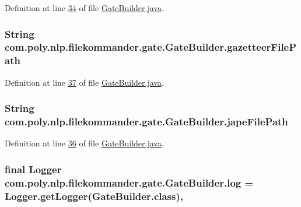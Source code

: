 Definition at line \hyperlink{L34}{34} of file \hyperlink{}{Gate\-Builder.\-java}.

\hypertarget{classcom_1_1poly_1_1nlp_1_1filekommander_1_1gate_1_1_gate_builder_adceaef80d20a83bd8c1cded83b90a692}{
\subsubsection[{gazetteer\-File\-Path}]{\setlength{\rightskip}{0pt plus 5cm}String com.\-poly.\-nlp.\-filekommander.\-gate.\-Gate\-Builder.\-gazetteer\-File\-Path\hspace{0.3cm}{\ttfamily [private]}}}\label{classcom_1_1poly_1_1nlp_1_1filekommander_1_1gate_1_1_gate_builder_adceaef80d20a83bd8c1cded83b90a692}


Definition at line \hyperlink{L37}{37} of file \hyperlink{}{Gate\-Builder.\-java}.

\hypertarget{classcom_1_1poly_1_1nlp_1_1filekommander_1_1gate_1_1_gate_builder_a58783e8638545aa5ea65a89aa1061dde}{
\subsubsection[{jape\-File\-Path}]{\setlength{\rightskip}{0pt plus 5cm}String com.\-poly.\-nlp.\-filekommander.\-gate.\-Gate\-Builder.\-jape\-File\-Path\hspace{0.3cm}{\ttfamily [private]}}}\label{classcom_1_1poly_1_1nlp_1_1filekommander_1_1gate_1_1_gate_builder_a58783e8638545aa5ea65a89aa1061dde}


Definition at line \hyperlink{L36}{36} of file \hyperlink{}{Gate\-Builder.\-java}.

\hypertarget{classcom_1_1poly_1_1nlp_1_1filekommander_1_1gate_1_1_gate_builder_abbd1c14bf5a3ef4f39d4563dd498c467}{
\subsubsection[{log}]{\setlength{\rightskip}{0pt plus 5cm}final Logger com.\-poly.\-nlp.\-filekommander.\-gate.\-Gate\-Builder.\-log = Logger.\-get\-Logger(Gate\-Builder.\-class)\hspace{0.3cm}{\ttfamily [static]}, {\ttfamily [private]}}}\label{classcom_1_1poly_1_1nlp_1_1filekommander_1_1gate_1_1_gate_builder_abbd1c14bf5a3ef4f39d4563dd498c467}



